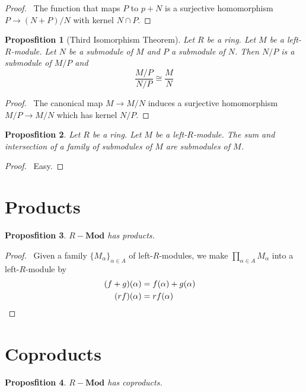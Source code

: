 \documentclass{book}
\let\qed\relax
\newtheorem{prop}{Proposfition}[chapter]
\theoremstyle{definition}
\newcommand{\Mod}[1]{\ensuremath{{#1}-\mathbf{Mod}}}
\begin{document}
\begin{proof}
\pf\ The function that maps $P$ to $p + N$ is a surjective homomorphism $P \rightarrow (N+P)/N$ with kernel $N \cap P$. \qed
\end{proof}

\begin{prop}[Third Isomorphism Theorem]
Let $R$ be a ring. Let $M$ be a left-$R$-module. Let $N$ be a submodule of $M$ and $P$ a submodule of $N$. Then $N/P$ is a submodule of $M/P$ and
\[ \frac{M/P}{N/P} \cong \frac{M}{N} \]
\end{prop}

\begin{proof}
\pf\ The canonical map $M \rightarrow M/N$ induces a surjective homomorphism $M/P \rightarrow M/N$ which has kernel $N/P$. \qed
\end{proof}

\begin{prop}
Let $R$ be a ring. Let $M$ be a left-$R$-module.
The sum and intersection of a family of submodules of $M$ are submodules of $M$.
\end{prop}

\begin{proof}
\pf\ Easy. \qed
\end{proof}

\section{Products}

\begin{prop}
$\Mod{R}$ has products.
\end{prop}

\begin{proof}
\pf\ Given a family $\{ M_\alpha \}_{\alpha \in A}$ of left-$R$-modules, we make $\prod_{\alpha \in A} M_\alpha$ into a left-$R$-module by
\begin{align*}
(f + g)(\alpha) & = f(\alpha) + g(\alpha) \\
(rf)(\alpha) & = rf(\alpha) & \qed
\end{align*}
\end{proof}

\section{Coproducts}

\begin{prop}
$\Mod{R}$ has coproducts.
\end{prop}
\end{document}
